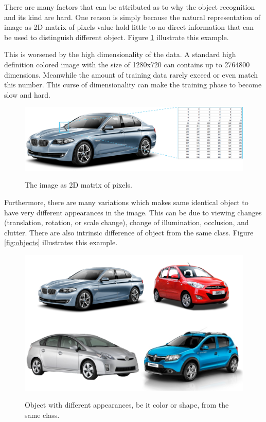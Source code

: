 \documentclass[a4paper,11pt]{kth-mag}
\begin{document}
There are many factors that can be attributed as to why the object recognition and its kind are hard. One reason is simply because the natural representation of image as 2D matrix of pixels value hold little to no direct information that can be used to distinguish different object. Figure \ref{fig:car} illustrate this example. 

This is worsened by the high dimensionality of the data. A standard high definition colored image with the size of 1280x720 can contains up to 2764800 dimensions. Meanwhile the amount of training data rarely exceed or even match this number. This curse of dimensionality can make the training phase to become slow and hard.

\begin{figure}[h]
\centering
\includegraphics[scale=0.4]{image/car.png}
\label{fig:car}
\caption{The image as 2D matrix of pixels.}
\end{figure}

Furthermore, there are many variations which makes same identical object to have very different appearances in the image. This can be due to viewing changes (translation, rotation, or scale change), change of illumination, occlusion, and clutter. There are also intrinsic difference of object from the same class. Figure \ref{fig:objects} illustrates this example.

\begin{figure}[h]
\centering
\includegraphics[scale=0.4]{image/cars.png}
\label{fig:cars}
\caption{Object with different appearances, be it color or shape, from the same class.}
\end{figure}
\end{document}
